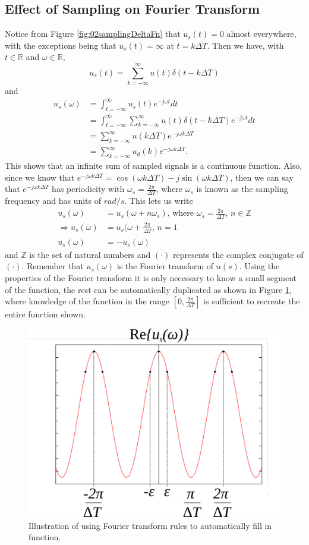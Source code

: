 \documentclass[lecture,12pt,]{pcms-l}
\newcommand{\tint}{\int_{t=-\infty}^\infty}
\newcommand{\w}{\omega}
\newcommand{\emjwt}{e^{-j\omega t}}
\begin{document}
\subsection{Effect of Sampling on Fourier Transform}
Notice from Figure \ref{fig:02samplingDeltaFn} that $u_s(t) = 0$ almost everywhere, with the exceptions being that $u_s(t) = \infty$ at $t=k\Delta T$. Then we have, with $t\in\mathbb{R}$ and $\w\in\mathbb{R}$,
$$u_s(t) = \sum_{k=-\infty}^\infty u(t)\delta(t-k\Delta T)$$
and
\begin{align*}
u_s(\w) &= \tint u_s(t)\emjwt dt \\
&= \tint \sum_{k=-\infty}^\infty u(t)\delta(t-k\Delta T)\emjwt dt \\
&= \sum_{k=-\infty}^\infty u(k\Delta T) e^{-j\w k\Delta T} \\
&= \sum_{k=-\infty}^\infty u_d(k) e^{-j\w k\Delta T}.
\end{align*}
This shows that an infinite sum of sampled signals is a continuous function. Also, since we know that $e^{-j\w k\Delta T} = \cos(\w k\Delta T) - j\sin(\w k\Delta T)$, then we can say that $e^{-j\w k\Delta T}$ has periodicity with $\w_s = \frac{2\pi}{\Delta T}$, where $\w_s$ is known as the sampling frequency and has units of $rad/s$. This lets us write
\begin{align*}
u_s(\w) &= u_s(\w+n\w_s) \text{, where } \w_s = \frac{2\pi}{\Delta T} \text{, } n\in\mathbb{Z} \\
\Rightarrow u_s(\w) &= u_s(\w+\frac{2\pi}{\Delta T} \text{, } n=1 \\
u_s(\w) &= -\overline{u_s(\w)}
\end{align*}
and $\mathbb{Z}$ is the set of natural numbers and $\overline{(\cdot)}$ represents the complex conjugate of $(\cdot)$. Remember that $u_s(\w)$ is the Fourier transform of $u(s)$. Using the properties of the Fourier transform it is only necessary to know a small segment of the function, the rest can be automatically duplicated as shown in Figure \ref{fig:02sin}, where knowledge of the function in the range $[0,\frac{2\pi}{\Delta T}]$ is sufficient to recreate the entire function shown.
\begin{figure}[ht!]
	\centering
	\includegraphics[width=.5\textwidth]{images/02sin}
	\caption{Illustration of using Fourier transform rules to automatically fill in function.}
	\label{fig:02sin}
\end{figure}
\end{document}
